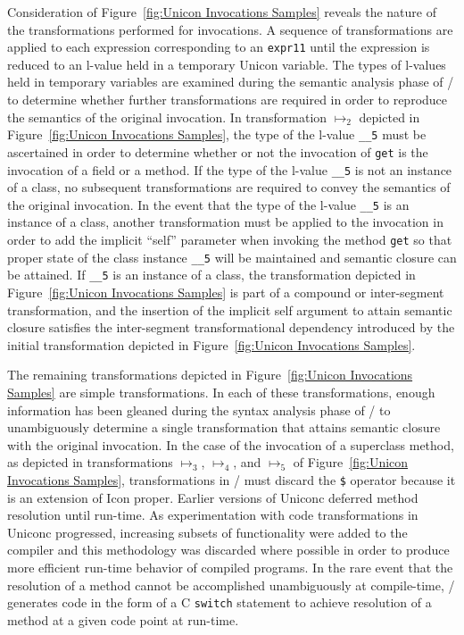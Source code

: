 Consideration of Figure~\ref{fig:Unicon Invocations Samples} reveals
the nature of the transformations performed for invocations.  A
sequence of transformations are applied to each expression
corresponding to an \texttt{expr11} until the expression is reduced to
an \mbox{l-value} held in a temporary Unicon variable.  The types of
\mbox{l-values} held in temporary variables are examined during the
semantic analysis phase of \Ic/ to determine whether further
transformations are required in order to reproduce the semantics of
the original invocation.  In transformation $\mapsto _2$ depicted in
Figure~\ref{fig:Unicon Invocations Samples}, the type of the
\mbox{l-value} \texttt{\_\_5} must be ascertained in order to
determine whether or not the invocation of \texttt{get} is the
invocation of a field or a method. If the type of the \mbox{l-value}
\texttt{\_\_5} is not an instance of a class, no subsequent
transformations are required to convey the semantics of the original
invocation.  In the event that the type of the \mbox{l-value}
\texttt{\_\_5} is an instance of a class, another transformation must
be applied to the invocation in order to add the implicit ``self''
parameter when invoking the method \texttt{get} so that proper state
of the class instance \texttt{\_\_5} will be maintained and semantic
closure can be attained. If \texttt{\_\_5} is an instance of a class,
the transformation depicted in Figure~\ref{fig:Unicon Invocations
Samples} is part of a compound or inter-segment transformation, and
the insertion of the implicit self argument to attain semantic closure
satisfies the inter-segment transformational dependency introduced by
the initial transformation depicted in Figure~\ref{fig:Unicon
Invocations Samples}.

The remaining transformations depicted in Figure~\ref{fig:Unicon Invocations
Samples} are simple transformations. In each of these transformations, enough
information has been gleaned during the syntax analysis phase of \Ut/ to
unambiguously determine a single transformation that attains semantic closure
with the original invocation. In the case of the invocation of a superclass
method, as depicted in transformations $\mapsto _3$, $\mapsto _4$, and $\mapsto
_5$ of Figure~\ref{fig:Unicon Invocations Samples}, transformations in \Ut/ must
discard the \texttt{\$} operator because it is an extension of Icon proper.
Earlier versions of Uniconc deferred method resolution until \mbox{run-time}. As
experimentation with code transformations in Uniconc progressed, increasing
subsets of functionality were added to the compiler and this methodology was
discarded where possible in order to produce more efficient \mbox{run-time} behavior of
compiled programs. In the rare event that the resolution of a method cannot be
accomplished unambiguously at \mbox{compile-time}, \Ic/ generates code in the form of a C
\texttt{switch} statement to achieve resolution of a method at a given code
point at \mbox{run-time}.

